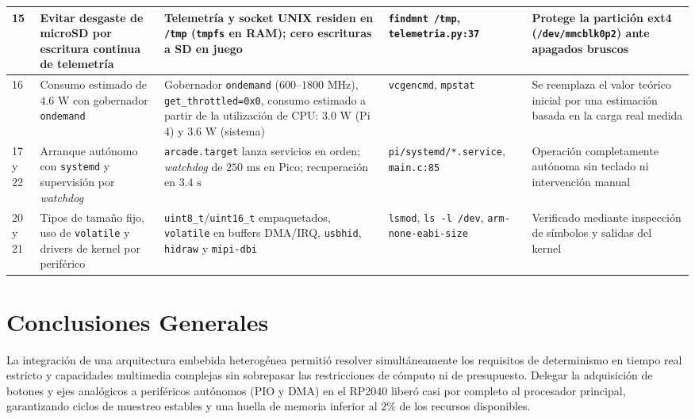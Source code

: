 \documentclass[conference]{IEEEtran}
\begin{document}
\begin{table}[!t]
\begin{tabular}{|p{0.9cm}|p{3.4cm}|p{4.2cm}|p{3.1cm}|p{3.8cm}|}
		\hline
		15 & Evitar desgaste de microSD por escritura continua de telemetría & Telemetría y socket UNIX residen en \texttt{/tmp} (\texttt{tmpfs} en RAM); cero escrituras a SD en juego & \texttt{findmnt /tmp}, \texttt{telemetria.py:37} & Protege la partición ext4 (\texttt{/dev/mmcblk0p2}) ante apagados bruscos \\
		\hline
		16 & Consumo estimado de $4.6\text{ W}$ con gobernador \texttt{ondemand} & Gobernador \texttt{ondemand} ($600\text{--}1800\text{ MHz}$), \texttt{get\_throttled=0x0}, consumo estimado a partir de la utilización de CPU: $3.0\text{ W}$ (Pi 4) y $3.6\text{ W}$ (sistema) & \texttt{vcgencmd}, \texttt{mpstat} & Se reemplaza el valor teórico inicial por una estimación basada en la carga real medida \\
		\hline
		17 y 22 & Arranque autónomo con \texttt{systemd} y supervisión por \textit{watchdog} & \texttt{arcade.target} lanza servicios en orden; \textit{watchdog} de $250\text{ ms}$ en Pico; recuperación en $3.4\text{ s}$ & \texttt{pi/systemd/*.service}, \texttt{main.c:85} & Operación completamente autónoma sin teclado ni intervención manual \\
		\hline
		20 y 21 & Tipos de tamaño fijo, uso de \texttt{volatile} y drivers de kernel por periférico & \texttt{uint8\_t}/\texttt{uint16\_t} empaquetados, \texttt{volatile} en buffers DMA/IRQ, \texttt{usbhid}, \texttt{hidraw} y \texttt{mipi-dbi} & \texttt{lsmod}, \texttt{ls -l /dev}, \texttt{arm-none-eabi-size} & Verificado mediante inspección de símbolos y salidas del kernel \\
		\hline
	\end{tabular}
\end{table}



\section{Conclusiones Generales}

La integración de una arquitectura embebida heterogénea permitió resolver simultáneamente los requisitos de determinismo en tiempo real estricto y capacidades multimedia complejas sin sobrepasar las restricciones de cómputo ni de presupuesto. Delegar la adquisición de botones y ejes analógicos a periféricos autónomos (PIO y DMA) en el RP2040 liberó casi por completo al procesador principal, garantizando ciclos de muestreo estables y una huella de memoria inferior al $2\%$ de los recursos disponibles.
\end{document}
